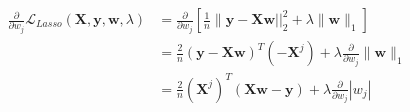 \newcommand{\matrix}[1]{\mathbf{#1}}
\newcommand{\vector}[1]{\mathbf{#1}}
\newcommand{\X}{\matrix{X}}
\newcommand{\y}{\vector{y}}
\newcommand{\w}{\vector{w}}
\newcommand{\r}{\vector{r}}
\begin{align*}
\frac{\partial}{\partial w_j} \mathcal{L}_{\textit{Lasso}}(\X,\y,\w,\lambda) &= \frac{\partial}{\partial w_j} \left[ \frac{1}{n} \|\y - \X\w||_2^2 + \lambda \|\w\|_1 \right] \\
&= \frac{2}{n} (\y - \X\w)^T (-\X^j) + \lambda \frac{\partial}{\partial w_j} \|\w\|_1 \\
&= \frac{2}{n} (\X^j)^T (\X\w - \y) + \lambda \frac{\partial}{\partial w_j} |w_j| \\
\end{align*}
